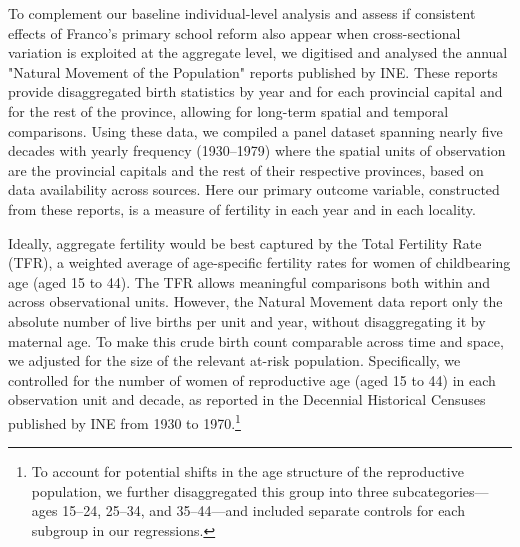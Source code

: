 \documentclass[a4paper,oneside,final,onecolumn,12pt,english]{article}
\begin{document}
To complement our baseline individual-level analysis and assess if consistent effects of Franco’s primary school reform also appear when cross-sectional variation is exploited at the aggregate level, we digitised and analysed the annual "Natural Movement of the Population" reports published by INE. These reports provide disaggregated birth statistics by year and for each provincial capital and for the rest of the province, allowing for long-term spatial and temporal comparisons. Using these data, we compiled a panel dataset spanning nearly five decades with yearly frequency (1930–1979) where the spatial units of observation are the provincial capitals and the rest of their respective provinces, based on data availability across sources. Here our primary outcome variable, constructed from these reports, is a measure of fertility in each year and in each locality.

Ideally, aggregate fertility would be best captured by the Total Fertility Rate (TFR), a weighted average of age-specific fertility rates for women of childbearing age (aged 15 to 44). The TFR allows meaningful comparisons both within and across observational units. However, the Natural Movement data report only the absolute number of live births per unit and year, without disaggregating it by maternal age. To make this crude birth count comparable across time and space, we adjusted for the size of the relevant at-risk population. Specifically, we controlled for the number of women of reproductive age (aged 15 to 44) in each observation unit and decade, as reported in the Decennial Historical Censuses published by INE from 1930 to 1970.\footnote{To account for potential shifts in the age structure of the reproductive population, we further disaggregated this group into three subcategories—ages 15–24, 25–34, and 35–44—and included separate controls for each subgroup in our regressions.}
\end{document}
